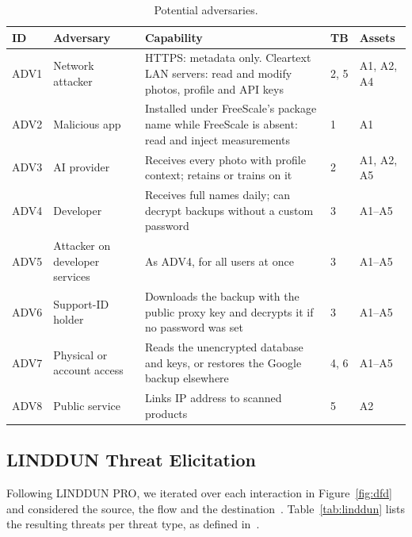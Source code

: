 \documentclass[a4paper,12pt]{article}
\begin{document}
\begin{table}[htbp]
\centering
\footnotesize
\caption{Potential adversaries.}
\label{tab:adversaries}
\begin{tabularx}{\textwidth}{@{}l l L l l@{}}
\toprule
\textbf{ID} & \textbf{Adversary} & \textbf{Capability} & \textbf{TB} & \textbf{Assets} \\
\midrule
ADV1 & Network attacker & HTTPS: metadata only. Cleartext LAN servers: read and modify photos,
  profile and API keys & 2, 5 & A1, A2, A4 \\
ADV2 & Malicious app & Installed under FreeScale's package name while FreeScale is absent:
  read and inject measurements & 1 & A1 \\
ADV3 & AI provider & Receives every photo with profile context; retains or trains on it & 2
  & A1, A2, A5 \\
ADV4 & Developer & Receives full names daily; can decrypt backups without a custom password & 3
  & A1--A5 \\
ADV5 & Attacker on developer services & As ADV4, for all users at once & 3 & A1--A5 \\
ADV6 & Support-ID holder & Downloads the backup with the public proxy key and decrypts it if no
  password was set & 3 & A1--A5 \\
ADV7 & Physical or account access & Reads the unencrypted database and keys, or restores the
  Google backup elsewhere & 4, 6 & A1--A5 \\
ADV8 & Public service & Links IP address to scanned products & 5 & A2 \\
\bottomrule
\end{tabularx}
\end{table}

\subsection{LINDDUN Threat Elicitation}
Following LINDDUN PRO, we iterated over each interaction in Figure~\ref{fig:dfd} and considered
the source, the flow and the destination~\cite{linddun-pro}. Table~\ref{tab:linddun} lists the
resulting threats per threat type, as defined in~\cite{linddun-types}.
\end{document}

